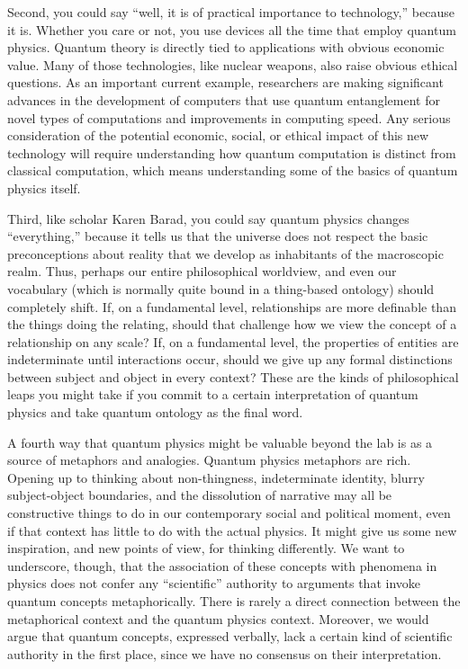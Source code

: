 \documentclass[onecolumn,preprintnumbers,amsmath,amssymbn,reprint,nofootinbib,superscriptaddress]{revtex4}    %
\begin{document}

Second, you could say ``well, it is of practical importance to technology,'' because it is.  Whether you care or not, you use devices all the time that employ quantum physics.  Quantum theory is directly tied to applications with obvious economic value.  Many of those technologies, like nuclear weapons, also raise obvious ethical questions.  As an important current example, researchers are making significant advances in the development of computers that use quantum entanglement for novel types of computations and improvements in computing speed. Any serious consideration of the potential economic, social, or ethical impact of this new technology will require understanding  how quantum computation is distinct from classical computation, which means understanding some of the basics of quantum physics itself.  

Third, like scholar Karen Barad, you could say quantum physics changes ``everything,'' because it tells us that the universe does not respect the basic preconceptions about reality that we develop as inhabitants of the macroscopic realm.  Thus, perhaps our entire philosophical worldview, and even our vocabulary (which is normally quite bound in a thing-based ontology) should completely shift.  If, on a fundamental level, relationships are more definable than the things doing the relating, should that challenge how we view the concept of a relationship on any scale?  If, on a fundamental level, the properties of entities are indeterminate until interactions occur, should we give up any formal distinctions between subject and object in every context?  These are the kinds of philosophical leaps you might take if you commit to a certain interpretation of quantum physics and take quantum ontology as the final word.  

A fourth way that quantum physics might be valuable beyond the lab is as a source of metaphors and analogies. Quantum physics metaphors are rich. Opening up to thinking about non-thingness, indeterminate identity, blurry subject-object boundaries, and the dissolution of narrative may all be constructive things to do in our contemporary social and political moment, even if that context has little to do with the actual physics.  It might give us some new inspiration, and new points of view, for thinking differently. We want to underscore, though, that the association of these concepts with phenomena in physics does not confer any ``scientific'' authority to arguments that invoke quantum concepts metaphorically.  There is rarely a direct connection between the metaphorical context and the quantum physics context.  Moreover, we would argue that quantum concepts, expressed verbally, lack a certain kind of scientific authority in the first place, since we have no consensus on their interpretation.
\end{document}
